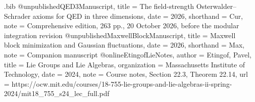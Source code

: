 \begin{filecontents*}[overwrite]{\jobname.bib}
@unpublished{QED3Manuscript,
  title = {The field-strength {Osterwalder--Schrader} axioms for {QED} in three dimensions},
  date = {2026},
  shorthand = {Cur},
  note = {Comprehensive edition, 263 pp., 20 October 2026, before the modular integration revision}
}
@unpublished{MaxwellBlockManuscript,
  title = {Maxwell block minimization and {Gaussian} fluctuations},
  date = {2026},
  shorthand = {Max},
  note = {Companion manuscript}
}
@online{EtingofLieNotes,
  author = {Etingof, Pavel},
  title = {Lie Groups and Lie Algebras},
  organization = {Massachusetts Institute of Technology},
  date = {2024},
  note = {Course notes, Section 22.3, Theorem 22.14},
  url = {https://ocw.mit.edu/courses/18-755-lie-groups-and-lie-algebras-ii-spring-2024/mit18_755_s24_lec_full.pdf}
}
\end{filecontents*}
\documentclass[11pt,letterpaper,reqno]{amsart}
\makeatletter
{}[2020/10/01]

\RequirePackage[T1]{fontenc}
\RequirePackage{lmodern}
\RequirePackage{microtype}
\RequirePackage[letterpaper,margin=1in,headheight=15pt]{geometry}
\RequirePackage{amsmath,amsthm,amssymb,mathtools}
\RequirePackage{enumitem}
\RequirePackage{perpage}
\RequirePackage{xcolor}
\RequirePackage[breaklinks=true,colorlinks=true,
  linkcolor=manuscriptred,citecolor=manuscriptblue,urlcolor=manuscriptmagenta]{hyperref}
\RequirePackage{cleveref}

\setcounter{tocdepth}{1}
\renewcommand{\thefigure}{\Roman{figure}}
\renewcommand{\thetable}{\Roman{table}}
\renewcommand{\thefootnote}{%
  \ifnum\value{footnote}>9\arabic{footnote}\else\fnsymbol{footnote}\fi}

\theoremstyle{definition}
\newtheorem{ms@theorem}{Theorem}
\renewcommand{\thems@theorem}{\Alph{ms@theorem}}
\newtheorem*{ms@theoremstar}{Theorem}
\newtheorem{ms@proposition}{Proposition}[section]
\newtheorem{ms@lemma}[ms@proposition]{Lemma}
\newtheorem{ms@definition}[ms@proposition]{Definition}
\newtheorem{ms@corollary}[ms@proposition]{Corollary}
\newtheorem*{ms@corollarystar}{Corollary}

